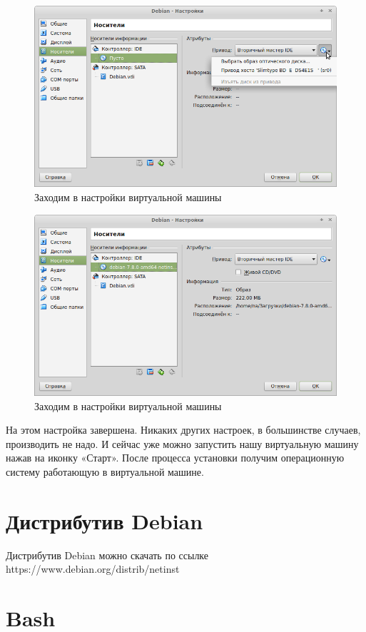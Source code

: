 \documentclass[12pt,a4paper]{article}
\begin{document}
\begin{figure}[h!]
\centering
\includegraphics[scale=0.45]{res/choose}
\caption{Заходим в настройки виртуальной машины}
\end{figure}

\begin{figure}[h!]
\centering
\includegraphics[scale=0.45]{res/chooseiso}
\caption{Заходим в настройки виртуальной машины}
\end{figure}

На этом настройка завершена. Никаких других настроек, в большинстве случаев, производить не надо. И сейчас уже можно запустить нашу виртуальную машину нажав на иконку «Старт». После процесса установки получим операционную систему работающую в виртуальной машине.

\newpage
\section{Дистрибутив Debian}
Дистрибутив Debian можно скачать по ссылке https://www.debian.org/distrib/netinst
\section{Bash}
\end{document}

